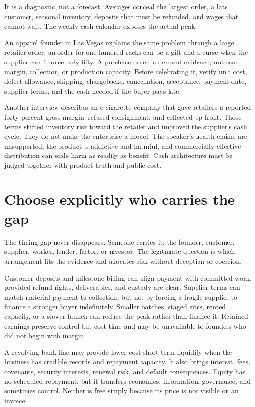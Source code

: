 It is a diagnostic, not a forecast. Averages conceal the largest order, a late
customer, seasonal inventory, deposits that must be refunded, and wages that
cannot wait. The weekly cash calendar exposes the actual peak.

An apparel founder in Las Vegas explains the same problem through a large
retailer order: an order for one hundred racks can be a gift and a curse when
the supplier can finance only fifty. A purchase order is demand evidence, not
cash, margin, collection, or production capacity. Before celebrating it, verify
unit cost, defect allowance, shipping, chargebacks, cancellation, acceptance,
payment date, supplier terms, and the cash needed if the buyer pays late.

Another interview describes an e-cigarette company that gave retailers a
reported forty-percent gross margin, refused consignment, and collected up
front. Those terms shifted inventory risk toward the retailer and improved the
supplier's cash cycle. They do not make the enterprise a model. The speaker's
health claims are unsupported, the product is addictive and harmful, and
commercially effective distribution can scale harm as readily as benefit.
Cash architecture must be judged together with product truth and public cost.

\section{Choose explicitly who carries the gap}

The timing gap never disappears. Someone carries it: the founder, customer,
supplier, worker, lender, factor, or investor. The legitimate question is which
arrangement fits the evidence and allocates risk without deception or coercion.

Customer deposits and milestone billing can align payment with committed work,
provided refund rights, deliverables, and custody are clear. Supplier terms can
match material payment to collection, but not by forcing a fragile supplier to
finance a stronger buyer indefinitely. Smaller batches, staged sites, rented
capacity, or a slower launch can reduce the peak rather than finance it. Retained
earnings preserve control but cost time and may be unavailable to founders who
did not begin with margin.

A revolving bank line may provide lower-cost short-term liquidity when the
business has credible records and repayment capacity. It also brings interest,
fees, covenants, security interests, renewal risk, and default consequences.
Equity has no scheduled repayment, but it transfers economics, information,
governance, and sometimes control. Neither is free simply because its price is
not visible on an invoice.

